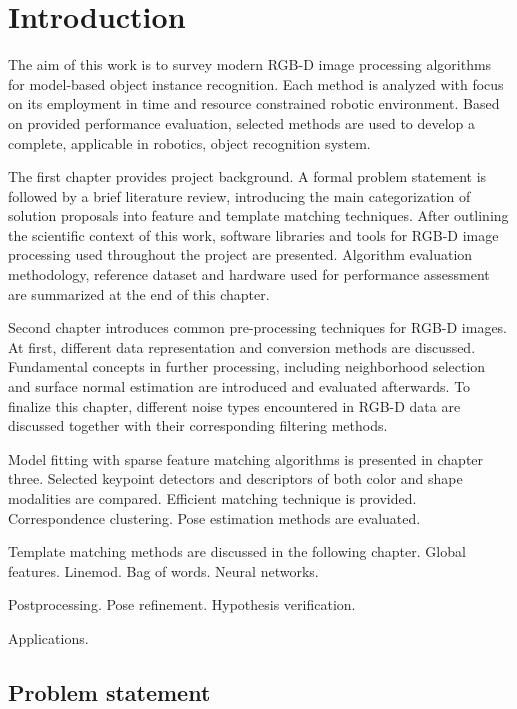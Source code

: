\chapter{Introduction}
\label{cha:introduction}

The aim of this work is to survey modern RGB-D image processing algorithms for model-based object instance recognition. Each method is analyzed with focus on its employment in time and resource constrained robotic environment. Based on provided performance evaluation, selected methods are used to develop a complete, applicable in robotics, object recognition system.

The first chapter provides project background. A formal problem statement is followed by a brief literature review, introducing the main categorization of solution proposals into feature and template matching techniques. After outlining the scientific context of this work, software libraries and tools for RGB-D image processing used throughout the project are presented. Algorithm evaluation methodology, reference dataset and hardware used for performance assessment are summarized at the end of this chapter.

Second chapter introduces common pre-processing techniques for RGB-D images. At first, different data representation and conversion methods are discussed. Fundamental concepts in further processing, including neighborhood selection and surface normal estimation are introduced and evaluated afterwards. To finalize this chapter, different noise types encountered in RGB-D data are discussed together with their corresponding filtering methods.
 
Model fitting with sparse feature matching algorithms is presented in chapter three. Selected keypoint detectors and descriptors of both color and shape modalities are compared. Efficient matching technique is provided. Correspondence clustering. Pose estimation methods are evaluated.

Template matching methods are discussed in the following chapter. Global features. Linemod. Bag of words. Neural networks.

Postprocessing. Pose refinement. Hypothesis verification.

Applications.


\section{Problem statement}
\label{sec:problem}

